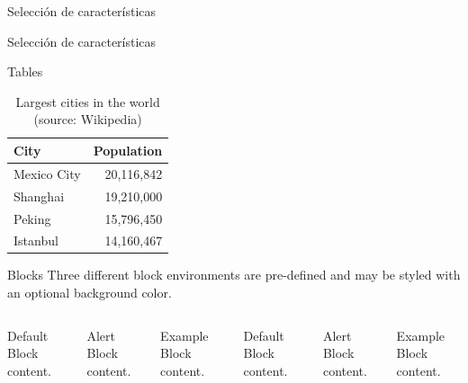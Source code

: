 \documentclass[10pt]{beamer}
\begin{document}
\begin{frame}[fragile]{Selección de características}


\end{frame}
\begin{frame}[fragile]{Selección de características}

\end{frame}

\begin{frame}{Tables}
  \begin{table}
    \caption{Largest cities in the world (source: Wikipedia)}
    \begin{tabular}{lr}
      \toprule
      City & Population\\
      \midrule
      Mexico City & 20,116,842\\
      Shanghai & 19,210,000\\
      Peking & 15,796,450\\
      Istanbul & 14,160,467\\
      \bottomrule
    \end{tabular}
  \end{table}
\end{frame}
\begin{frame}{Blocks}
  Three different block environments are pre-defined and may be styled with an
  optional background color.

  \begin{columns}[T,onlytextwidth]
      \begin{block}{Default}
        Block content.
      \end{block}

      \begin{alertblock}{Alert}
        Block content.
      \end{alertblock}

      \begin{exampleblock}{Example}
        Block content.
      \end{exampleblock}



      \begin{block}{Default}
        Block content.
      \end{block}

      \begin{alertblock}{Alert}
        Block content.
      \end{alertblock}

      \begin{exampleblock}{Example}
        Block content.
      \end{exampleblock}

  \end{columns}
\end{frame}
\end{document}
